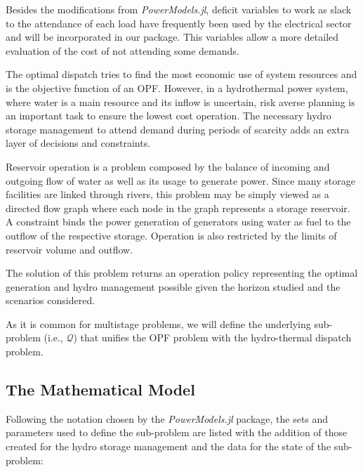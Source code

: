 \documentclass{juliacon}
\begin{document}
Besides the modifications from \textit{PowerModels.jl}, deficit variables to work as slack to the attendance of each load have frequently been used by the electrical sector and will be incorporated in our package. This variables allow a more detailed evaluation of the cost of not attending some demands. 

The optimal dispatch tries to find the most economic use of system resources and is the objective function of an OPF. However, in a hydrothermal power system, where water is a main resource and its inflow is uncertain, risk averse planning is an important task to ensure the lowest cost operation. The necessary hydro storage management to attend demand during periods of scarcity adds an extra layer of decisions and constraints.

Reservoir operation is a problem composed by the balance of incoming and outgoing flow of water as well as its usage to generate power. Since many storage facilities are linked through rivers, this problem may be simply viewed as a directed flow graph where each node in the graph represents a storage reservoir. A constraint binds the power generation of generators using water as fuel to the outflow of the respective storage. Operation is also restricted by the limits of reservoir volume and outflow.

The solution of this problem returns an operation policy representing the optimal generation and hydro management possible given the horizon studied and the scenarios considered.

As it is common for multistage problems, we will define the underlying sub-problem (i.e., $\mathcal{Q}$) that unifies the OPF problem with the hydro-thermal dispatch problem.

\subsection{The Mathematical Model}
\label{subsub:mathmodel}

Following the notation chosen by the \textit{PowerModels.jl} package, the sets and parameters used to define the sub-problem are listed with the addition of those created for the hydro storage management and the data for the state of the sub-problem:
\end{document}
